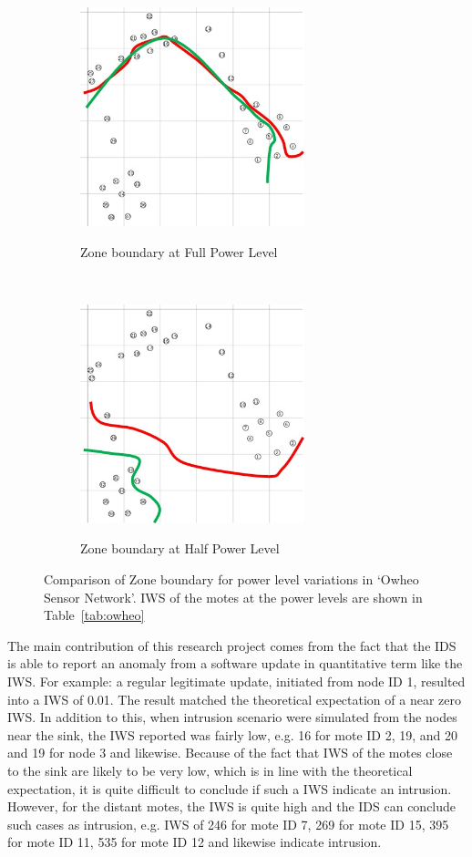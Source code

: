 \documentclass[conference,manuscript]{IEEEtran}
\begin{document}
\begin{figure}[t!]
\label{fig:owheo}
    \centering
    \begin{subfigure}[b]{0.5\textwidth}
        \centering
        \includegraphics[height=2.5in]{Owheo_full}
        \label{subfig:owheo_full}
        \caption{Zone boundary at Full Power Level}
    \end{subfigure}%
    ~ 
    \begin{subfigure}[b]{0.5\textwidth}
        \centering
        \includegraphics[height=2.5in]{Owheo_half}
        \label{subfig:owheo_half}
        \caption{Zone boundary at Half Power Level}
    \end{subfigure}
    \caption{Comparison of Zone boundary for power level variations in `Owheo Sensor Network'. IWS of the motes at the power levels are shown in Table~\ref{tab:owheo}}
\end{figure}

The main contribution of this research project comes from the fact that the IDS is able to report an anomaly from a software update in quantitative term like the IWS.
For example:  a regular legitimate update, initiated from node ID 1, resulted into a IWS of 0.01.
The result matched the theoretical expectation of a near zero IWS.
In addition to this, when intrusion scenario were simulated from the nodes near the sink, the IWS reported was fairly low, e.g. 16 for mote ID 2, 19, and 20
 and 19 for node 3 
 and likewise.
Because of the fact that IWS of the motes close to the sink are likely to be very low, which is in line with the theoretical expectation, it is quite difficult to conclude if such a IWS indicate an intrusion. 
However, for the distant motes, the IWS is quite high and the IDS can conclude such cases as intrusion, e.g. IWS of 246 for mote ID 7, 269 for mote ID 15, 395 for mote ID 11, 535 for mote ID 12 and likewise indicate intrusion.
\end{document}
